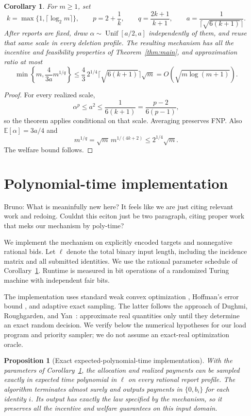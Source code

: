 \documentclass[11pt]{article}
\newtheorem{proposition}[theorem]{Proposition}
\newtheorem{corollary}[theorem]{Corollary}
\newcommand{\bruno}[1]{{\color{red}Bruno: #1}}
\begin{document}
\begin{corollary}
\label{cor:schedule}
For $m\ge1$, set
\[
k=\max\{1,\lceil\log_2m\rceil\},
\qquad
p=2+\frac1k,
\qquad
q=\frac{2k+1}{k+1},
\qquad
a=\frac1{\lceil\sqrt{6(k+1)}\rceil}.
\]
After reports are fixed, draw
$\alpha\sim\operatorname{Unif}[a/2,a]$
independently of them, and reuse that same scale in every
deletion profile.
The resulting mechanism has all the incentive and feasibility
properties of Theorem~\ref{thm:main}, and approximation ratio
at most
\[
\min\left\{m,\frac4{3a}m^{1/q}\right\}
\le
\frac43\,2^{1/4}
\lceil\sqrt{6(k+1)}\rceil\sqrt m
=
O\!\left(\sqrt{m\log(m+1)}\right).
\]
\end{corollary}

\begin{proof}
For every realized scale,
\[
\alpha^p
\le a^2
\le\frac1{6(k+1)}
=
\frac{p-2}{6(p-1)},
\]
so the theorem applies conditional on that scale.
Averaging preserves FNP.
Also $\mathbb{E}[\alpha]=3a/4$ and
\[
m^{1/q}
=
\sqrt m\,m^{1/(4k+2)}
\le2^{1/4}\sqrt m.
\]
The welfare bound follows.
\end{proof}


\section{Polynomial-time implementation}
\label{sec:computation}
\bruno{What is meaninfully new here? It feels like we are just citing relevant work and redoing. Couldnt this eciton just be two paragraph, citing proper work that meks our mechanism by poly-time?}

We implement the mechanism on explicitly encoded targets and
nonnegative rational bids.
Let $\ell$ denote the total binary input length, including the
incidence matrix and all submitted identities.
We use the rational parameter schedule of
Corollary~\ref{cor:schedule}.
Runtime is measured in bit operations of a randomized Turing
machine with independent fair bits.

The implementation uses standard weak convex optimization
\cite[Chapters~3--5]{compGLS1993}, Hoffman's error bound
\cite{compHoffman1952}, and adaptive exact sampling.
The latter follows the approach of Dughmi, Roughgarden, and
Yan~\cite[Appendix~B, especially Claim~B.3]{compDRY2011}:
approximate real quantities only until they determine an exact
random decision.
We verify below the numerical hypotheses for our load program
and priority sampler; we do not assume an exact-real
optimization oracle.

\begin{proposition}[Exact expected-polynomial-time implementation]
\label{prop:implementation}
With the parameters of Corollary~\ref{cor:schedule}, the allocation
and realized payments can be sampled exactly in expected time
polynomial in $\ell$ on every rational report profile.
The algorithm terminates almost surely and outputs payments
in $\{0,b_i\}$ for each identity $i$.
Its output has exactly the law specified by the mechanism,
so it preserves all the incentive and welfare guarantees
on this input domain.
\end{proposition}
\end{document}
